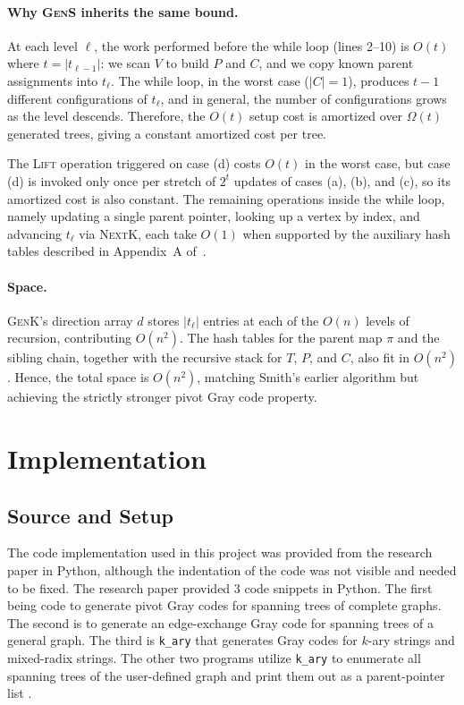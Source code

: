 \documentclass{article}
\begin{document}
\paragraph{Why \textsc{GenS} inherits the same bound.}
At each level $\ell$, the work performed before the while loop (lines 2--10) is $O(t)$ where $t = |t_{\ell-1}|$: we scan $V$ to build $P$ and $C$, and we copy known parent assignments into $t_\ell$. The while loop, in the worst case ($|C|=1$), produces $t-1$ different configurations of $t_\ell$, and in general, the number of configurations grows as the level descends. Therefore, the $O(t)$ setup cost is amortized over $\Omega(t)$ generated trees, giving a constant amortized cost per tree.

The \textsc{Lift} operation triggered on case (d) costs $O(t)$ in the worst case, but case (d) is invoked only once per stretch of $2^t$ updates of cases (a), (b), and (c), so its amortized cost is also constant. The remaining operations inside the while loop, namely updating a single parent pointer, looking up a vertex by index, and advancing $t_\ell$ via \textsc{NextK}, each take $O(1)$ when supported by the auxiliary hash tables described in Appendix~A of~\cite{liu2026}.

\paragraph{Space.}
\textsc{GenK}'s direction array $d$ stores $|t_\ell|$ entries at each of the $O(n)$ levels of recursion, contributing $O(n^2)$. The hash tables for the parent map $\pi$ and the sibling chain, together with the recursive stack for $T$, $P$, and $C$, also fit in $O(n^2)$. Hence, the total space is $O(n^2)$, matching Smith's earlier algorithm but achieving the strictly stronger pivot Gray code property.



\section{Implementation}

\subsection{Source and Setup}

The code implementation used in this project was provided from the research paper in Python, although the indentation of the code was not visible and needed to be fixed. The research paper provided 3 code snippets in Python. The first being code to generate pivot Gray codes for spanning trees of complete graphs. The second is to generate an edge-exchange Gray code for spanning trees of a general graph. The third is \texttt{k\_ary} that generates Gray codes for $k$-ary strings and mixed-radix strings. The other two programs utilize \texttt{k\_ary} to enumerate all spanning trees of the user-defined graph and print them out as a parent-pointer list \cite{liu2026}.
\end{document}
